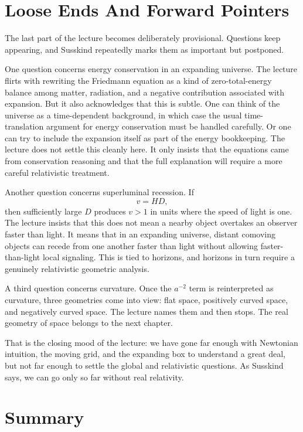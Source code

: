 \section{Loose Ends And Forward Pointers}

The last part of the lecture becomes deliberately provisional. Questions keep appearing, and Susskind repeatedly marks them as important but postponed.

One question concerns energy conservation in an expanding universe. The lecture flirts with rewriting the Friedmann equation as a kind of zero-total-energy balance among matter, radiation, and a negative contribution associated with expansion. But it also acknowledges that this is subtle. One can think of the universe as a time-dependent background, in which case the usual time-translation argument for energy conservation must be handled carefully. Or one can try to include the expansion itself as part of the energy bookkeeping. The lecture does not settle this cleanly here. It only insists that the equations came from conservation reasoning and that the full explanation will require a more careful relativistic treatment.

Another question concerns superluminal recession. If
\begin{equation}
v=HD,
\end{equation}
then sufficiently large \(D\) produces \(v>1\) in units where the speed of light is one. The lecture insists that this does not mean a nearby object overtakes an observer faster than light. It means that in an expanding universe, distant comoving objects can recede from one another faster than light without allowing faster-than-light local signaling. This is tied to horizons, and horizons in turn require a genuinely relativistic geometric analysis.

A third question concerns curvature. Once the \(a^{-2}\) term is reinterpreted as curvature, three geometries come into view: flat space, positively curved space, and negatively curved space. The lecture names them and then stops. The real geometry of space belongs to the next chapter.

That is the closing mood of the lecture: we have gone far enough with Newtonian intuition, the moving grid, and the expanding box to understand a great deal, but not far enough to settle the global and relativistic questions. As Susskind says, we can go only so far without real relativity.

\section{Summary}

